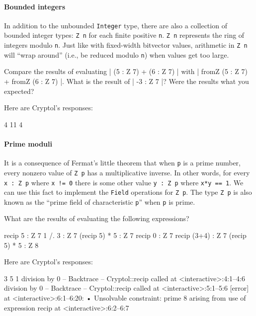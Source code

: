 \paragraph*{Bounded integers}
In addition to the unbounded \texttt{Integer} type, there are also a
collection of bounded integer types: \texttt{Z n} for each finite
positive \texttt{n}.  \texttt{Z n} represents the ring of integers modulo \texttt{n}.
Just like with fixed-width bitvector values, arithmetic in
\texttt{Z n} will ``wrap around'' (i.e., be reduced modulo \texttt{n})
when values get too large.
\restartrepl
\begin{Exercise}\label{ex:int:2}
  Compare the results of evaluating \replin| (5 : Z 7) + (6 : Z 7) |
  with \replin| fromZ (5 : Z 7) + fromZ (6 : Z 7) |.
  What is the result of \replin| -3 : Z 7 |?
  Were the results what you expected?
\end{Exercise}
\begin{Answer}
Here are Cryptol's responses:
\begin{reploutVerb}
  4
  11
  4
\end{reploutVerb}
\end{Answer}

\paragraph*{Prime moduli}
It is a consequence of Fermat's little theorem that when \texttt{p} is
a prime number, every nonzero value of \texttt{Z p} has a
multiplicative inverse.  In other words, for every \texttt{x : Z p}
where \texttt{x != 0} there is some other value
\texttt{y : Z p} where \texttt{x*y == 1}.  We can use this fact to
implement the \texttt{Field} operations for \texttt{Z p}.
The type \texttt{Z p} is also known as the
``prime field of characteristic \texttt{p}'' when \texttt{p} is prime.

\restartrepl
\begin{Exercise}\label{ex:int:3}
What are the results of evaluating the following expressions?
\begin{replinVerb}
  recip 5 : Z 7
  1 /. 3 : Z 7
  (recip 5) * 5 : Z 7
  recip 0 : Z 7
  recip (3+4) : Z 7
  (recip 5) * 5 : Z 8
\end{replinVerb}
\end{Exercise}
\begin{Answer}
Here are Cryptol's responses:
\begin{reploutVerb}
  3
  5
  1
  division by 0
  -- Backtrace --
  Cryptol::recip called at <interactive>:4:1--4:6
  division by 0
  -- Backtrace --
  Cryptol::recip called at <interactive>:5:1--5:6
  [error] at <interactive>:6:1--6:20:
  • Unsolvable constraint:
      prime 8
      arising from
      use of expression recip
      at <interactive>:6:2--6:7
\end{reploutVerb}
\end{Answer}

